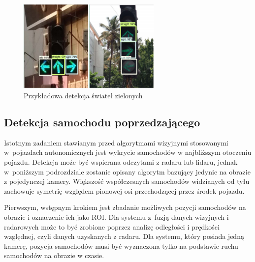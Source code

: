 \begin{figure}
  \centering
  \includegraphics[width=7cm]{img/traffic_light3_results.png}
  \caption{Przykładowa detekcja świateł zielonych\cite{T10}}
  \label{fig:traffic_light3_results}
\end{figure}




\subsection{Detekcja samochodu poprzedzającego}
\label{sec:car_general}

Istotnym zadaniem stawianym przed algorytmami wizyjnymi stosowanymi w~pojazdach autonomicznych jest wykrycie samochodów w najbliższym otoczeniu pojazdu. 
Detekcja może być wspierana odczytami z radaru lub lidaru, jednak w~poniższym podrozdziale zostanie opisany algorytm bazujący jedynie na obrazie z pojedynczej kamery.
Większość współczesnych samochodów widzianych od tyłu zachowuje symetrię względem pionowej osi przechodzącej przez środek pojazdu. 

Pierwszym, wstępnym krokiem jest zbadanie możliwych pozycji samochodów na obrazie i oznaczenie ich jako ROI.
Dla systemu z~fuzją danych wizyjnych i radarowych może to być zrobione poprzez analizę odległości i prędkości względnej, czyli danych uzyskanych z radaru. 
Dla systemu, który posiada jedną kamerę, pozycja samochodów musi być wyznaczona tylko na podstawie ruchu samochodów na obrazie w czasie.

